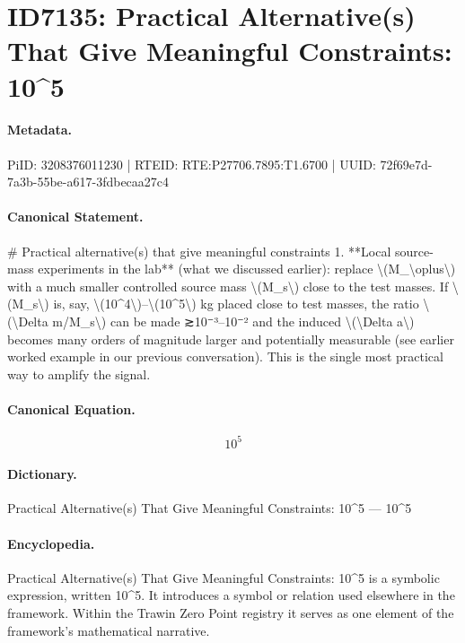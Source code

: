 \section*{ID7135: Practical Alternative(s) That Give Meaningful Constraints: 10\textasciicircum{}5}
\paragraph{Metadata.}
PiID: 3208376011230 | RTEID: RTE:P27706.7895:T1.6700 | UUID: 72f69e7d-7a3b-55be-a617-3fdbecaa27c4

\paragraph{Canonical Statement.}
\# Practical alternative(s) that give meaningful constraints 1. **Local source-mass experiments in the lab** (what we discussed earlier): replace \textbackslash{}(M\_\textbackslash{}oplus\textbackslash{}) with a much smaller controlled source mass \textbackslash{}(M\_s\textbackslash{}) close to the test masses. If \textbackslash{}(M\_s\textbackslash{}) is, say, \textbackslash{}(10\textasciicircum{}4\textbackslash{})–\textbackslash{}(10\textasciicircum{}5\textbackslash{}) kg placed close to test masses, the ratio \textbackslash{}(\textbackslash{}Delta m/M\_s\textbackslash{}) can be made ≳10⁻³–10⁻² and the induced \textbackslash{}(\textbackslash{}Delta a\textbackslash{}) becomes many orders of magnitude larger and potentially measurable (see earlier worked example in our previous conversation). This is the single most practical way to amplify the signal.

\paragraph{Canonical Equation.}
\[
10^5
\]

\paragraph{Dictionary.}
Practical Alternative(s) That Give Meaningful Constraints: 10\textasciicircum{}5 — 10\textasciicircum{}5

\paragraph{Encyclopedia.}
Practical Alternative(s) That Give Meaningful Constraints: 10\textasciicircum{}5 is a symbolic expression, written 10\textasciicircum{}5. It introduces a symbol or relation used elsewhere in the framework. Within the Trawin Zero Point registry it serves as one element of the framework's mathematical narrative.
